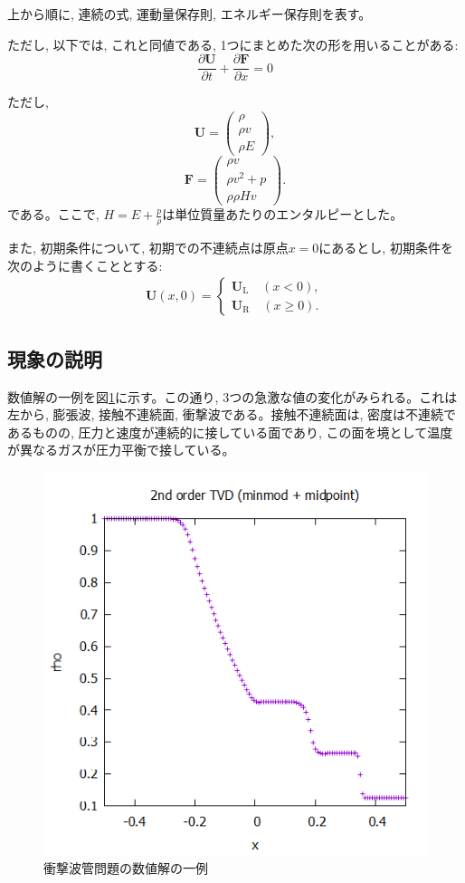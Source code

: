 \documentclass[dvipdfmx,b5paper]{jsarticle}
\begin{document}
上から順に, 連続の式, 運動量保存則, エネルギー保存則を表す。

ただし, 以下では, これと同値である, 1つにまとめた次の形を用いることがある: 
\begin{equation}
  \frac{\partial \bm{U}}{\partial t}+\frac{\partial \bm{F}}{\partial x}=0
  \label{eq}
\end{equation}

ただし, 
\begin{equation}
  \bm{U}=
  \begin{pmatrix}
    \rho \\
    \rho v \\
    \rho E
  \end{pmatrix}, 
\end{equation}
\begin{equation}
  \bm{F}=
  \begin{pmatrix}
    \rho v \\
    \rho v^2+p \\
    \rho \rho Hv
  \end{pmatrix}.  
\end{equation}
である。ここで, $H=E+\frac{p}{\rho}$は単位質量あたりのエンタルピーとした。

また, 初期条件について, 初期での不連続点は原点$x=0$にあるとし, 初期条件を次のように書くこととする: 
\begin{eqnarray*}
  \bm{U}(x, 0)=
    \begin{cases}
        \bm{U}_{\mathrm{L}}\quad (x<0), \\
        \bm{U}_{\mathrm{R}}\quad (x\geq 0). 
    \end{cases}
\end{eqnarray*}

\subsection{現象の説明}

数値解の一例を図\ref{ex}に示す。この通り, 3つの急激な値の変化がみられる。これは左から, 膨張波, 接触不連続面, 衝撃波である。接触不連続面は, 密度は不連続であるものの, 圧力と速度が連続的に接している面であり, この面を境として温度が異なるガスが圧力平衡で接している。

\begin{figure}[H]
  \centering
  \includegraphics[width = 0.6\linewidth]{../book/chap03/10_shock-tube-minmod/03.png}
  \caption{衝撃波管問題の数値解の一例}
  \label{ex}
\end{figure}
\end{document}
